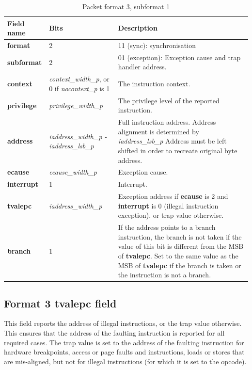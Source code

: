 \begin{table}[htp]
  \centering
  \caption{Packet format 3, subformat 1}
  \label{tab:te_inst3}
  \begin{tabulary}{\textwidth}{|l|p{35mm}|p{90mm}|}
    \hline
    {\bf Field name} & {\bf Bits} & {\bf Description} \\
    \hline
    \textbf{format} & 2 & 11 (sync): synchronisation\\
    \hline
    \textbf{subformat} & 2 & 01 (exception): Exception cause and trap handler address.\\
    \hline
    \textbf{context} &  \textit {context\_width\_p}, 
               or 0 if \textit {nocontext\_p} is 1 & 
               The instruction context. \\
    \hline
    \textbf{privilege} & \textit {privilege\_width\_p} & 
                The privilege level of the reported instruction.\\
    \hline
    \textbf{address} & \textit {iaddress\_width\_p - iaddress\_lsb\_p} & 
              Full instruction address.  Address alignment is determined by \textit {iaddress\_lsb\_p} Address must be left shifted in order to recreate original byte address. \\
    \hline
    \textbf{ecause} & \textit {ecause\_width\_p} & 
             Exception cause. \\
    \hline
    \textbf{interrupt} & 1 & 
                Interrupt. \\
    \hline
    \textbf{tvalepc} & \textit {iaddress\_width\_p} & 
           Exception address if \textbf{ecause} is 2 and \textbf{interrupt} is 0 (illegal instruction exception), or trap value otherwise.\\
    \hline
    \textbf{branch} & 1 & If the address points to a branch instruction, the branch is not taken if the value of this bit is different from the MSB of \textbf{tvalepc}. 
    Set to the same value as the MSB of \textbf{tvalepc} if the branch is taken or the instruction is not a branch. \\
    \hline
  \end{tabulary}
\end{table}

\subsection{Format 3 \textbf{tvalepc} field}

This field reports the address of illegal instructions, or the trap value otherwise.  This ensures that
the address of the faulting instruction is reported for all required cases.  The trap value 
is set to the address of the faulting instruction for hardware breakpoints, access or page faults and 
instructions, loads or stores that are mis-aligned, but not for illegal instructions (for which it is set to the opcode).

